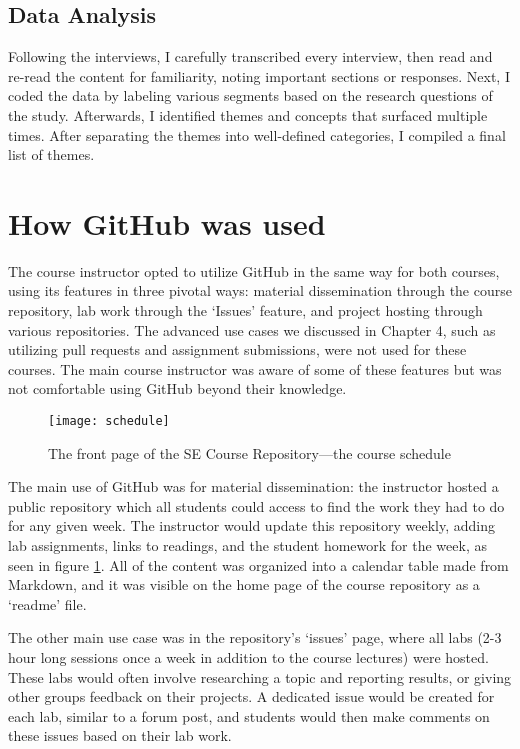 \subsection{Data Analysis}
Following the interviews, I carefully transcribed every interview, then read and re-read the content for familiarity, noting important sections or responses. Next, I coded the data by labeling various segments based on the research questions of the study. Afterwards, I identified themes and concepts that surfaced multiple times. After separating the themes into well-defined categories, I compiled a final list of themes.



\section{How GitHub was used}
The course instructor opted to utilize GitHub in the same way for both courses, using its features in three pivotal ways: material dissemination through the course repository, lab work through the `Issues' feature, and project hosting through various repositories. The advanced use cases we discussed in Chapter 4, such as utilizing pull requests and assignment submissions, were not used for these courses. The main course instructor was aware of some of these features but was not comfortable using GitHub beyond their knowledge.

\begin{figure}[h!]
 \caption{The front page of the SE Course Repository---the course schedule}
 \centering
   \texttt{[image: schedule]}
 \label{fig:schedule}
\end{figure}

The main use of GitHub was for material dissemination: the instructor hosted a public repository which all students could access to find the work they had to do for any given week. The instructor would update this repository weekly, adding lab assignments, links to readings, and the student homework for the week, as seen in figure \ref{fig:schedule}. All of the content was organized into a calendar table made from Markdown, and it was visible on the home page of the course repository as a `readme' file.

The other main use case was in the repository's `issues' page, where all labs (2-3 hour long sessions once a week in addition to the course lectures) were hosted. These labs would often involve researching a topic and reporting results, or giving other groups feedback on their projects. A dedicated issue would be created for each lab, similar to a forum post, and students would then make comments on these issues based on their lab work.

